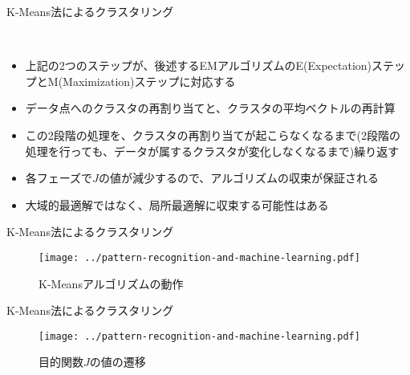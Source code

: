\documentclass[dvipdfmx,notheorems,t]{beamer}
\begin{document}
\begin{frame}{K-Means法によるクラスタリング}
\begin{itemize}
\begin{enumerate}
	\end{enumerate} \
	\begin{itemize}
		\item 上記の2つのステップが、後述する\alert{EMアルゴリズム}の\alert{E(Expectation)ステップ}と\alert{M(Maximization)ステップ}に対応する
		\newline
		\item データ点へのクラスタの再割り当てと、クラスタの平均ベクトルの再計算
		\newline
		\item この2段階の処理を、クラスタの再割り当てが起こらなくなるまで(2段階の処理を行っても、データが属するクラスタが変化しなくなるまで)繰り返す
		\newline
		\item 各フェーズで$J$の値が減少するので、アルゴリズムの収束が保証される
		\item 大域的最適解ではなく、局所最適解に収束する可能性はある
	\end{itemize}
\end{itemize}

\end{frame}

\begin{frame}{K-Means法によるクラスタリング}

\begin{figure}[h]
	\centering
	\texttt{[image: ../pattern-recognition-and-machine-learning.pdf]}
	\caption{K-Meansアルゴリズムの動作}
\end{figure}

\end{frame}

\begin{frame}{K-Means法によるクラスタリング}

\begin{figure}[h]
	\centering
	\texttt{[image: ../pattern-recognition-and-machine-learning.pdf]}
	\caption{目的関数$J$の値の遷移}
\end{figure}

\end{frame}
\end{document}
